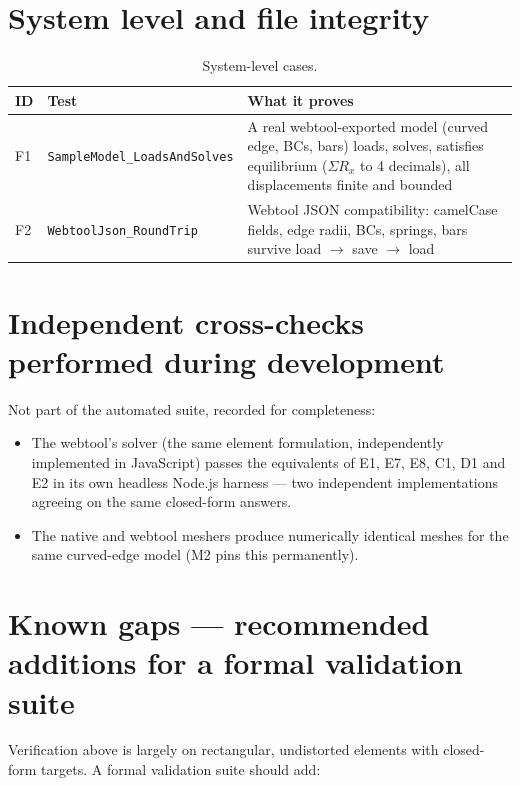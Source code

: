 \documentclass[11pt,a4paper]{article}
\begin{document}
\section{System level and file integrity}

\begin{table}[H]\small\centering
\begin{tabular}{@{}llp{8.6cm}@{}}
\toprule
ID & Test & What it proves \\
\midrule
F1 & \texttt{SampleModel\_LoadsAndSolves} & A real webtool-exported model (curved edge, BCs, bars) loads, solves, satisfies equilibrium ($\Sigma R_x$ to 4 decimals), all displacements finite and bounded \\
F2 & \texttt{WebtoolJson\_RoundTrip} & Webtool JSON compatibility: camelCase fields, edge radii, BCs, springs, bars survive load $\to$ save $\to$ load \\
\bottomrule
\end{tabular}
\caption{System-level cases.}
\end{table}

\section{Independent cross-checks performed during development}

Not part of the automated suite, recorded for completeness:
\begin{itemize}
  \item The webtool's solver (the same element formulation, independently
        implemented in JavaScript) passes the equivalents of E1, E7, E8, C1,
        D1 and E2 in its own headless Node.js harness --- two independent
        implementations agreeing on the same closed-form answers.
  \item The native and webtool meshers produce numerically identical meshes
        for the same curved-edge model (M2 pins this permanently).
\end{itemize}

\section{Known gaps --- recommended additions for a formal validation suite}

Verification above is largely on rectangular, undistorted elements with
closed-form targets. A formal validation suite should add:
\end{document}
